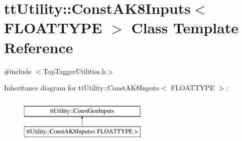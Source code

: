 \hypertarget{classttUtility_1_1ConstAK8Inputs}{\section{tt\-Utility\-:\-:Const\-A\-K8\-Inputs$<$ F\-L\-O\-A\-T\-T\-Y\-P\-E $>$ Class Template Reference}
\label{classttUtility_1_1ConstAK8Inputs}
}


{\ttfamily \#include $<$Top\-Tagger\-Utilities.\-h$>$}

Inheritance diagram for tt\-Utility\-:\-:Const\-A\-K8\-Inputs$<$ F\-L\-O\-A\-T\-T\-Y\-P\-E $>$\-:\begin{figure}[H]
\begin{center}
\leavevmode
\includegraphics[height=2.000000cm]{classttUtility_1_1ConstAK8Inputs}
\end{center}
\end{figure}

